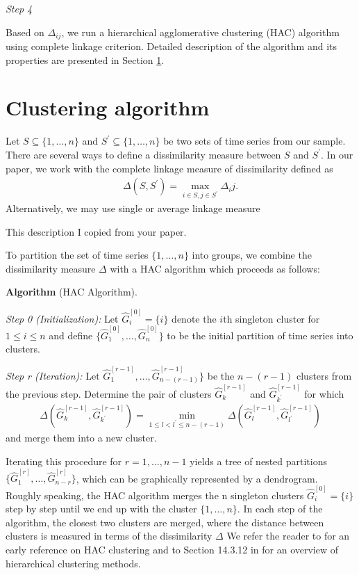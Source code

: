 \documentclass[a4paper,11pt]{article}
\numberwithin{equation}{section}
\begin{document}
\textit{Step 4}

Based on $\Delta_{ij}$, we run a hierarchical agglomerative clustering (HAC) algorithm using complete linkage criterion. Detailed description of the algorithm and its properties are presented in Section \ref{sec:alg}.

\section{Clustering algorithm}\label{sec:alg}

Let $S \subseteq \{1, \ldots, n\}$ and $S^\prime \subseteq \{1, \ldots, n\}$ be two sets of time series from our sample. There are several ways to define a dissimilarity measure between $S$ and $S^\prime$. In our paper, we work with the complete linkage measure of dissimilarity defined as 
\begin{align*}
\Delta (S, S^\prime) = \max_{i \in S, j\in S^\prime} \Delta_ij.
\end{align*}
Alternatively, we may use single or average linkage measure 

{\color{red} This description I copied from your paper.

To partition the set of time series $\{1,\ldots, n\}$ into groups, we combine the dissimilarity measure $\Delta$ with a HAC algorithm which proceeds as follows:

\textbf{Algorithm} (HAC Algorithm).

\textit{Step 0 (Initialization):} Let $\hat{G}_i^{[0]} = \{i\}$ denote the $i$th singleton cluster for $1 \leq i \leq n$ and define $\{\hat{G}_1^{[0]}, \ldots, \hat{G}_n^{[0]}\}$ to be the
initial partition of time series into clusters.

\textit{Step r (Iteration):} Let $\hat{G}^{[r-1]}_1, \ldots, \hat{G}^{[r-1]}_{n - (r-1)}\}$ be the $n-(r-1)$ clusters from the previous step. Determine the pair of clusters $\hat{G}^{[r-1]}_k$ and $\hat{G}^{[r-1]}_{k^\prime}$ for which 
\begin{align*}
\Delta(\hat{G}^{[r-1]}_{k}, \hat{G}^{[r-1]}_{k^\prime}) = \min_{1 \leq l < l^\prime \leq n- (r-1)} \Delta(\hat{G}^{[r-1]}_{l}, \hat{G}^{[r-1]}_{l^\prime})
\end{align*}
and merge them into a new cluster.

Iterating this procedure for $r = 1, \ldots, n-1$ yields a tree of nested partitions \linebreak $\{\hat{G}^{[r]}_1, \ldots, \hat{G}^{[r]}_{n-r} \}$, which can be graphically
represented by a dendrogram. Roughly speaking, the HAC algorithm merges the n singleton clusters $\hat{G}^{[0]}_i = \{i\}$ step by step until we end up with the cluster $\{1, \ldots, n\}$. In each step of the algorithm, the closest two clusters are merged, where the distance between clusters is measured in terms of the dissimilarity $\Delta$ We refer the reader to \cite{Ward1963} for an early reference on HAC clustering and to Section 14.3.12 in \cite{HastieTibshiraniFriedman2009} for an overview of hierarchical clustering methods.}
\end{document}
